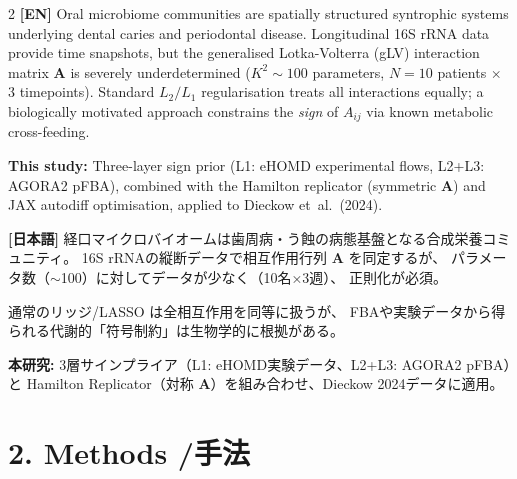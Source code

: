 \documentclass[10pt,a4paper]{article}
\newcommand{\bA}{\mathbf{A}}
\begin{document}
\begin{multicols}{2}
\small
\textbf{[EN]}
Oral microbiome communities are spatially structured syntrophic systems underlying
dental caries and periodontal disease.
Longitudinal 16S rRNA data provide time snapshots, but the generalised Lotka-Volterra
(gLV) interaction matrix $\bA$ is severely underdetermined
($K^2 \sim 100$ parameters, $N{=}10$ patients $\times$ 3 timepoints).
Standard $L_2/L_1$ regularisation treats all interactions equally;
a biologically motivated approach constrains the \emph{sign} of $A_{ij}$ via known
metabolic cross-feeding.

\textbf{This study:} Three-layer sign prior (L1: eHOMD experimental flows,
L2+L3: AGORA2 pFBA), combined with the Hamilton replicator (symmetric $\bA$)
and JAX autodiff optimisation, applied to Dieckow et~al.~(2024).

\columnbreak

\textbf{[日本語]}
経口マイクロバイオームは歯周病・う蝕の病態基盤となる合成栄養コミュニティ。
16S rRNAの縦断データで相互作用行列 $\bA$ を同定するが、
パラメータ数（$\sim$100）に対してデータが少なく（10名×3週）、
正則化が必須。

通常のリッジ/LASSO は全相互作用を同等に扱うが、
FBAや実験データから得られる代謝的「符号制約」は生物学的に根拠がある。

\textbf{本研究:} 3層サインプライア（L1: eHOMD実験データ、L2+L3: AGORA2 pFBA）と
Hamilton Replicator（対称 $\bA$）を組み合わせ、Dieckow 2024データに適用。
\end{multicols}

\section{2. Methods \quad /\quad 手法}
\end{document}
